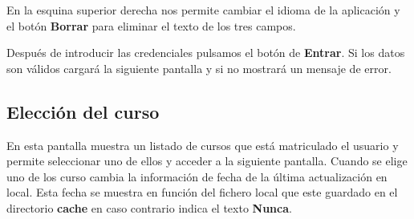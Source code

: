 En la esquina superior derecha nos permite cambiar el idioma de la aplicación y el botón \textbf{Borrar} para eliminar el texto de los tres campos. 

Después de introducir las credenciales pulsamos el botón de \textbf{Entrar}. Si los datos son válidos cargará la siguiente pantalla y si no mostrará un mensaje de error.


\subsection{Elección del curso}

En esta pantalla muestra un listado de cursos que está matriculado el usuario y permite seleccionar uno de ellos y acceder a la siguiente pantalla. Cuando se elige uno de los curso cambia la información de fecha de la última actualización en local. Esta fecha se muestra en función del fichero local que este guardado en el directorio \textbf{cache} en caso contrario indica el texto \textbf{Nunca}.




